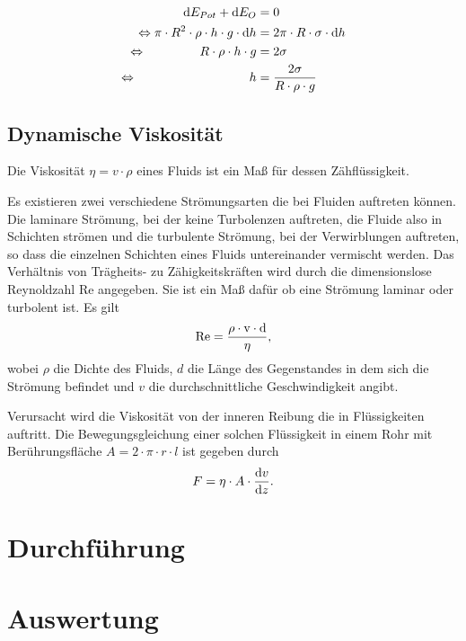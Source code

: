 \documentclass[12pt, a4paper, twoside]{scrartcl}
\begin{document}
\begin{align*}
\textup dE_{Pot}+\textup dE_{O}&=0 \\
\Leftrightarrow\pi\cdot R^2\cdot\rho\cdot h \cdot g\cdot\textup dh&=2\pi\cdot R\cdot\sigma\cdot\textup dh \\
\Leftrightarrow\hspace{1.5cm} R\cdot\rho\cdot h\cdot g&=2\sigma \\
\Leftrightarrow\hspace{3.15cm} h&=\frac{2\sigma}{R\cdot\rho\cdot g}
\end{align*}


\subsection{Dynamische Viskosität}
Die Viskosität $\eta=v\cdot\rho$ eines Fluids ist ein Maß für dessen Zähflüssigkeit.\linebreak

Es existieren zwei verschiedene Strömungsarten die bei Fluiden auftreten können. Die laminare Strömung, bei der keine Turbolenzen auftreten, die Fluide also in Schichten strömen und die turbulente Strömung, bei der Verwirblungen auftreten, so dass die einzelnen Schichten eines Fluids untereinander vermischt werden.\newline
Das Verhältnis von Trägheits- zu Zähigkeitskräften wird durch die dimensionslose  Reynoldzahl Re angegeben. Sie ist ein Maß dafür ob eine Strömung laminar oder turbolent ist. Es gilt
\begin{align*}
  \rm{Re}=\frac{\rho\cdot v\cdot d}{\eta},
\end{align*}
 wobei $\rho$ die Dichte des Fluids, $d$ die Länge des Gegenstandes in dem sich die Strömung befindet und $v$ die durchschnittliche Geschwindigkeit  angibt.\linebreak

Verursacht wird die Viskosität von der inneren Reibung die in Flüssigkeiten auftritt. Die Bewegungsgleichung einer solchen Flüssigkeit in einem Rohr mit Berührungsfläche $A=2\cdot\pi\cdot r\cdot l$ ist gegeben durch \[F=\eta\cdot A\cdot\frac{\textup dv}{\textup dz}.\]



\section{Durchführung}
\label{sec:durchfuehrung}

\section{Auswertung}
\label{sec:auswertung}
\end{document}

